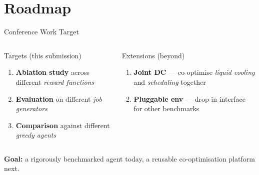 
\section{Roadmap}

\begin{frame}{Conference Work Target}
  \begin{columns}[T,onlytextwidth]
      \begin{block}{Targets (this submission)}
        \begin{enumerate}
          \item \textbf{Ablation study} across different \emph{reward functions}
          \item \textbf{Evaluation} on different \emph{job generators}
          \item \textbf{Comparison} against different \emph{greedy agents}
        \end{enumerate}
      \end{block}

      \begin{alertblock}{Extensions (beyond)}
        \begin{enumerate}
          \item \textbf{Joint DC} --- co-optimise \emph{liquid cooling} and \emph{scheduling} together
          \item \textbf{Pluggable env} --- drop-in interface for other benchmarks
        \end{enumerate}
      \end{alertblock}
  \end{columns}

  \vspace{0.6em}
  \centering
  \small\textcolor{DeepBlue}{\textbf{Goal:}} a rigorously benchmarked agent today, a reusable co-optimisation platform next.
\end{frame}
